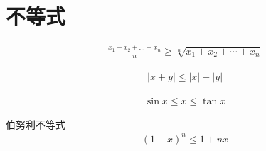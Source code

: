 \section{不等式}

\begin{align}
\frac{x_1+x_2+\dots+x_n}{n}\geqslant \sqrt[n]{x_1+x_2+\cdots+x_n}
\end{align}

\begin{align}
|x+y|\leqslant|x|+|y|
\end{align}

\begin{align}
\sin x \leqslant x \leqslant \tan x
\end{align}

伯努利不等式
\begin{align}
(1+x)^n\leqslant 1+nx
\end{align}
